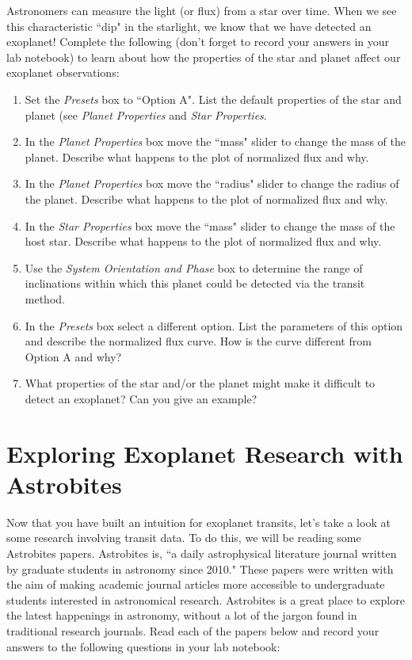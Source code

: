 \documentclass[11pt]{article}%
\begin{document}
Astronomers can measure the light (or flux) from a star over time. When we see this characteristic ``dip" in the starlight, we know that we have detected an exoplanet! Complete the following (don't forget to record your answers in your lab notebook) to learn about how the properties of the star and planet affect our exoplanet observations:

\begin{enumerate}
\item  Set the \emph{Presets} box to ``Option A". List the default properties of the star and planet (see \emph{Planet Properties} and \emph{Star Properties}.
\item In the \emph{Planet Properties} box move the ``mass" slider to change the mass of the planet.  Describe what happens to the plot of normalized flux and why.
\item In the \emph{Planet Properties} box move the ``radius" slider to change the radius of the planet.  Describe what happens to the plot of normalized flux and why.
\item In the \emph{Star Properties} box move the ``mass" slider to change the mass of the host star.  Describe what happens to the plot of normalized flux and why.
\item Use the \emph{System Orientation and Phase} box to determine the range of inclinations within which this planet could be detected via the transit method.
\item In the \emph{Presets} box select a different option.  List the parameters of this option and describe the normalized flux curve.  How is the curve different from Option A and why?
\item What properties of the star and/or the planet might make it difficult to detect an exoplanet? Can you give an example?
\end{enumerate}

\vspace{0.1in}

\section{Exploring Exoplanet Research with Astrobites} 

\noindent Now that you have built an intuition for exoplanet transits, let's take a look at some research involving transit data. To do this, we will be reading some Astrobites papers. Astrobites is, ``a daily astrophysical literature journal written by graduate students in astronomy since 2010." These papers were written with the aim of making academic journal articles more accessible to undergraduate students interested in astronomical research. Astrobites is a great place to explore the latest happenings in astronomy, without a lot of the jargon found in traditional research journals. Read each of the papers below and record your answers to the following questions in your lab notebook:
\end{document}
